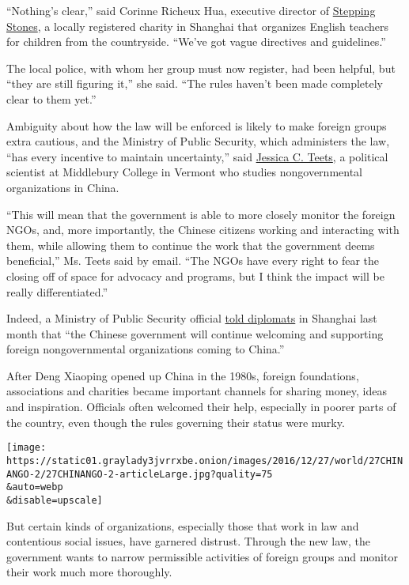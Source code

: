 ``Nothing's clear,'' said Corinne Richeux Hua, executive director of
\href{http://steppingstoneschina.net/}{Stepping Stones}, a locally
registered charity in Shanghai that organizes English teachers for
children from the countryside. ``We've got vague directives and
guidelines.''

The local police, with whom her group must now register, had been
helpful, but ``they are still figuring it,'' she said. ``The rules
haven't been made completely clear to them yet.''

Ambiguity about how the law will be enforced is likely to make foreign
groups extra cautious, and the Ministry of Public Security, which
administers the law, ``has every incentive to maintain uncertainty,''
said
\href{http://www.middlebury.edu/academics/ps/faculty/node/25661}{Jessica
C. Teets}, a political scientist at Middlebury College in Vermont who
studies nongovernmental organizations in China.

``This will mean that the government is able to more closely monitor the
foreign NGOs, and, more importantly, the Chinese citizens working and
interacting with them, while allowing them to continue the work that the
government deems beneficial,'' Ms. Teets said by email. ``The NGOs have
every right to fear the closing off of space for advocacy and programs,
but I think the impact will be really differentiated.''

Indeed, a Ministry of Public Security official
\href{http://www.mps.gov.cn/n2253534/n2253535/n2253537/c5542815/content.html}{told
diplomats} in Shanghai last month that ``the Chinese government will
continue welcoming and supporting foreign nongovernmental organizations
coming to China.''

After Deng Xiaoping opened up China in the 1980s, foreign foundations,
associations and charities became important channels for sharing money,
ideas and inspiration. Officials often welcomed their help, especially
in poorer parts of the country, even though the rules governing their
status were murky.

\texttt{[image: https://static01.graylady3jvrrxbe.onion/images/2016/12/27/world/27CHINANGO-2/27CHINANGO-2-articleLarge.jpg?quality=75\\\&auto=webp\\\&disable=upscale]}

But certain kinds of organizations, especially those that work in law
and contentious social issues, have garnered distrust. Through the new
law, the government wants to narrow permissible activities of foreign
groups and monitor their work much more thoroughly.

